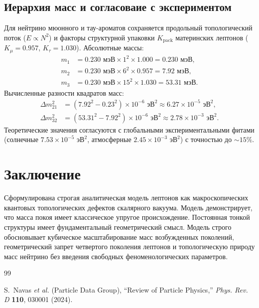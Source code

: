 \documentclass[12pt,a4paper]{article}
\begin{document}
\subsection{Иерархия масс и согласоваие с экспериментом}
Для нейтрино мюонного и тау-ароматов сохраняется продольный топологический поток ($E \propto N^2$) и факторы структурной упаковки $K_{\text{pack}}$ материнских лептонов ($K_\mu = 0.957$, $K_\tau = 1.030$). Абсолютные массы:
\begin{align}
m_1 &= 0.230 \text{ мэВ} \times 1^2 \times 1.000 = 0.230 \text{ мэВ}, \\
m_2 &= 0.230 \text{ мэВ} \times 6^2 \times 0.957 = 7.92 \text{ мэВ}, \\
m_3 &= 0.230 \text{ мэВ} \times 15^2 \times 1.030 = 53.31 \text{ мэВ}.
\end{align}
Вычисленные разности квадратов масс:
\begin{align}
\Delta m^2_{21} &= (7.92^2 - 0.23^2) \times 10^{-6} \text{ эВ}^2 \approx 6.27 \times 10^{-5} \text{ эВ}^2, \\
\Delta m^2_{32} &= (53.31^2 - 7.92^2) \times 10^{-6} \text{ эВ}^2 \approx 2.78 \times 10^{-3} \text{ эВ}^2.
\end{align}
Теоретические значения согласуются с глобальными экспериментальными фитами \cite{pdg2024} (солнечные $7.53 \times 10^{-5} \text{ эВ}^2$, атмосферные $2.45 \times 10^{-3} \text{ эВ}^2$) с точностью до $\sim 15\%$.

\section{Заключение}
Сформулирована строгая аналитическая модель лептонов как макроскопических квантовых топологических дефектов скалярного вакуума. Модель демонстрирует, что масса покоя имеет классическое упругое происхождение. Постоянная тонкой структуры имеет фундаментальный геометрический смысл. Модель строго обосновывает кубическое масштабирование масс возбужденных поколений, геометрический запрет четвертого поколения лептонов и топологическую природу масс нейтрино без введения свободных феноменологических параметров.

\begin{thebibliography}{99}

S.~Navas \textit{et al.} (Particle Data Group), ``Review of Particle Physics,'' \textit{Phys. Rev. D} \textbf{110}, 030001 (2024).

\end{thebibliography}
\end{document}
